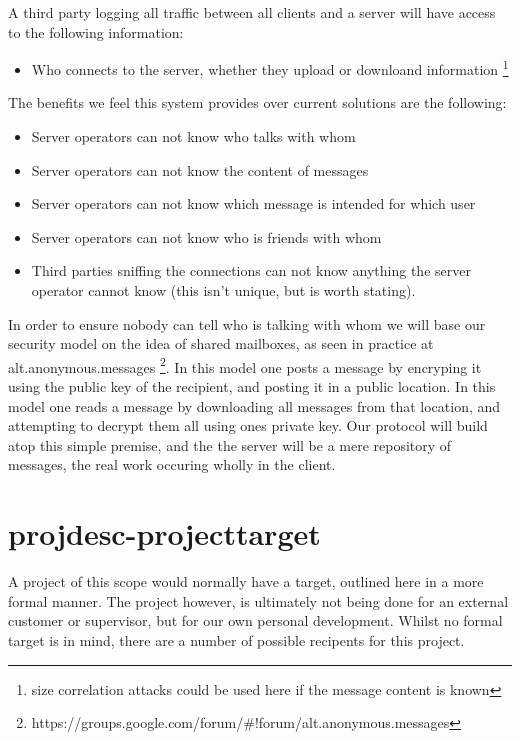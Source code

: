 A third party logging all traffic between all clients and a server will have
access to the following information: 
\begin{itemize}
\item Who connects to the server, whether they upload or downloand information
\footnote{size correlation attacks could be used here if the message content is
known}
\end{itemize}

The benefits we feel this system provides over current solutions are the
following:
\begin{itemize}
\item Server operators can not know who talks with whom
\item Server operators can not know the content of messages
\item Server operators can not know which message is intended for which user
\item Server operators can not know who is friends with whom
\item Third parties sniffing the connections can not know anything the server
operator cannot know (this isn't unique, but is worth stating).
\end{itemize}

In order to ensure nobody can tell who is talking with whom we will base our
security model on the idea of shared mailboxes, as seen in practice at
alt.anonymous.messages
\footnote{https://groups.google.com/forum/\#!forum/alt.anonymous.messages}.
In this model one posts a message by encryping it using the public key of the
recipient, and posting it in a public location. In this model one reads a
message by downloading all messages from that location, and attempting to
decrypt them all using ones private key. Our protocol will build atop this
simple premise, and the the server will be a mere repository of messages, the
real work occuring wholly in the client.

\section{projdesc-projecttarget}
A project of this scope would normally have a target, outlined here in a more
formal manner. The project however, is ultimately not being done for an external
customer or supervisor, but for our own personal development. Whilst no formal
target is in mind, there are a number of possible recipents for this project.

